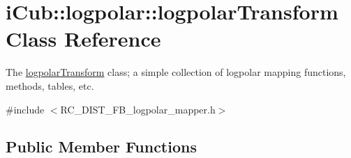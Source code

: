 \section{i\+Cub\+:\+:logpolar\+:\+:logpolar\+Transform Class Reference}
\label{classiCub_1_1logpolar_1_1logpolarTransform}


The \hyperlink{classiCub_1_1logpolar_1_1logpolarTransform}{logpolar\+Transform} class; a simple collection of logpolar mapping functions, methods, tables, etc.  




{\ttfamily \#include $<$R\+C\+\_\+\+D\+I\+S\+T\+\_\+\+F\+B\+\_\+logpolar\+\_\+mapper.\+h$>$}

\subsection*{Public Member Functions}
